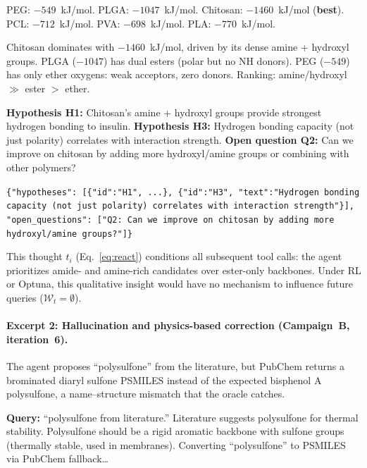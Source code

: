 \documentclass[twocolumn]{fairmeta}
\begin{document}
\begin{toolcall}
\scriptsize
PEG: $-549$~kJ/mol. PLGA: $-1047$~kJ/mol. Chitosan: $-1460$~kJ/mol (\textbf{best}).
PCL: $-712$~kJ/mol. PVA: $-698$~kJ/mol. PLA: $-770$~kJ/mol.
\end{toolcall}

\begin{agentthought}
\scriptsize
Chitosan dominates with $-1460$~kJ/mol, driven by its dense amine + hydroxyl groups.
PLGA ($-1047$) has dual esters (polar but no NH donors). PEG ($-549$) has only ether oxygens: weak acceptors, zero donors.
Ranking: amine/hydroxyl $\gg$ ester $>$ ether.

\textbf{Hypothesis H1:} Chitosan's amine + hydroxyl groups provide strongest hydrogen bonding to insulin.
\textbf{Hypothesis H3:} Hydrogen bonding capacity (not just polarity) correlates with interaction strength.
\textbf{Open question Q2:} Can we improve on chitosan by adding more hydroxyl/amine groups or combining with other polymers?
\end{agentthought}

\begin{toolcall}
\scriptsize
\texttt{\{"hypotheses": [\{"id":"H1", ...\}, \{"id":"H3", "text":"Hydrogen bonding capacity (not just polarity) correlates with interaction strength"\}], "open\_questions": ["Q2: Can we improve on chitosan by adding more hydroxyl/amine groups?"]\}}
\end{toolcall}

\noindent This thought $t_i$ (Eq.~\ref{eq:react}) conditions all subsequent tool calls: the agent prioritizes amide- and amine-rich candidates over ester-only backbones.
Under RL or Optuna, this qualitative insight would have no mechanism to influence future queries ($\mathcal{W}_t = \emptyset$).

\paragraph{Excerpt 2: Hallucination and physics-based correction (Campaign~B, iteration~6).}
The agent proposes ``polysulfone'' from the literature, but PubChem returns a brominated diaryl sulfone PSMILES instead of the expected bisphenol A polysulfone, a name--structure mismatch that the oracle catches.

\begin{agentthought}
\scriptsize
\textbf{Query:} ``polysulfone from literature.''
Literature suggests polysulfone for thermal stability.
Polysulfone should be a rigid aromatic backbone with sulfone groups (thermally stable, used in membranes).
Converting ``polysulfone'' to PSMILES via PubChem fallback\ldots
\end{agentthought}
\end{document}
